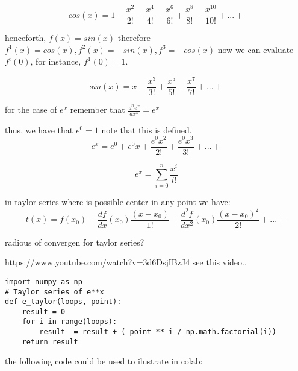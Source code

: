 \documentclass[10pt,a4paper]{article}
\begin{document}
\begin{equation}
cos(x) = 1 - \frac{x^{2}}{2!} + \frac{x^{4}}{4!} - \frac{x^{6}}{6!} + \frac{x^{8}}{8!} - \frac{x^{10}}{10!} +...+
\end{equation}

henceforth, $ f(x) =  sin(x)$  therefore $f^{1}(x) = cos(x), f^{2}(x) = -sin(x), f^{3} = -cos(x) $  now we can evaluate $f^{i}(0)$, for instance, $f^{1}(0) = 1$.

\begin{equation}
sin(x) = x - \frac{x^{3}}{3!} + \frac{x^{5}}{5!} - \frac{x^{7}}{7!} +...+
\end{equation}


for the case of $e^{x}$ remember that $\frac{d^{n}e^{x}}{dx^{n}} = e^{x}$

thus, we have that $e^{0} = 1$ note that this is defined. 
\begin{equation}
e^{x} = e^{0}  + e^{0}x + \frac{e^{0}x^{2}}{2!} + \frac{e^{0}x^{3}}{3!}+...+
\end{equation}


\begin{equation}
e^{x} = \sum_{i=0}^{n} \frac{x^{i}}{i!}
\end{equation}


in taylor series where is possible center in any point we have:
\begin{equation}
t(x) = f(x_{0})+\frac{df}{dx}(x_{0})\frac{(x - x_{0})}{1!} + \frac
{d^{2}f}{dx^{2}}(x_{0})\frac{(x-x_{0})^{2}}{2!}+...+
\end{equation}


radious of convergen for taylor series?

https://www.youtube.com/watch?v=3d6DsjIBzJ4
see this video..


\begin{lstlisting}
import numpy as np
# Taylor series of e**x
def e_taylor(loops, point):
    result = 0
    for i in range(loops):
        result  = result + ( point ** i / np.math.factorial(i))
    return result
\end{lstlisting}

the following code could be used to ilustrate in colab:
\end{document}
